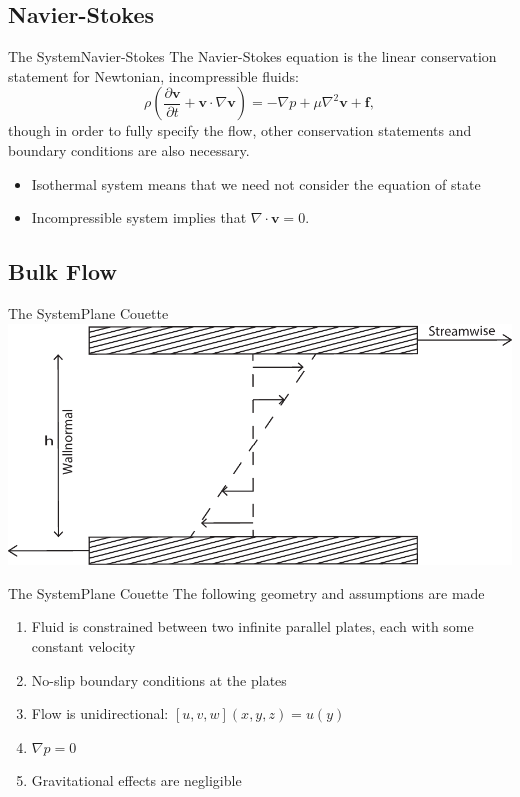 \documentclass[10pt]{beamer}
\begin{document}
\subsection{Navier-Stokes}
\begin{frame}{The System}{Navier-Stokes}
The Navier-Stokes equation is the linear conservation statement for Newtonian, incompressible fluids:
\begin{equation}
 \rho \left(\frac{\partial \mathbf{v}}{\partial t} + \mathbf{v} \cdot \nabla \mathbf{v}\right) = -\nabla p + \mu \nabla^2 \mathbf{v} + \mathbf{f},
\end{equation}
though in order to fully specify the flow, other conservation statements and boundary conditions are also necessary. 
\begin{itemize}
\item<1-> Isothermal system means that we need not consider the equation of state
\item<2-> Incompressible system implies that $\nabla \cdot \mathbf{v} = 0$.
\end{itemize}
\end{frame}
\subsection{Bulk Flow}
\begin{frame}{The System}{Plane Couette}
\includegraphics[scale=0.6]{Data/planeCouette}
\end{frame}
\begin{frame}{The System}{Plane Couette}
  The following geometry and assumptions are made
  \begin{enumerate}
    \item {Fluid is constrained between two infinite parallel plates, each with some constant velocity}
    \item {No-slip boundary conditions at the plates}
    \item {Flow is unidirectional: $[u,v,w](x,y,z) = u(y)$}
\item{$\nabla p = 0$}
\item{Gravitational effects are negligible} 
  \end{enumerate}  
\end{frame}
\end{document}
